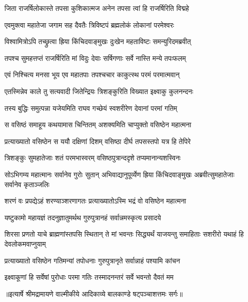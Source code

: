 \twolineshloka
{जिता राजर्षिलोकास्ते तपसा कुशिकात्मज}
{अनेन तपसा त्वां हि राजर्षिरिति विद्महे} %

\twolineshloka
{एवमुक्त्वा महातेजा जगाम सह दैवतैः}
{त्रिविष्टपं ब्रह्मलोकं लोकानां परमेश्वरः} %

\twolineshloka
{विश्वामित्रोऽपि तच्छ्रुत्वा ह्रिया किंचिदवाङ्मुखः}
{दुःखेन महताविष्टः समन्युरिदमब्रवीत्} %

\twolineshloka
{तपश्च सुमहत्तप्तं राजर्षिरिति मां विदुः}
{देवाः सर्षिगणाः सर्वे नास्ति मन्ये तपःफलम्} %

\twolineshloka
{एवं निश्चित्य मनसा भूय एव महातपाः}
{तपश्चचार काकुत्स्थ परमं परमात्मवान्} %

\twolineshloka
{एतस्मिन्नेव काले तु सत्यवादी जितेन्द्रियः}
{त्रिशङ्कुरिति विख्यात इक्ष्वाकु कुलनन्दनः} %

\twolineshloka
{तस्य बुद्धिः समुत्पन्ना यजेयमिति राघव}
{गच्छेयं स्वशरीरेण देवानां परमां गतिम्} %

\twolineshloka
{स वसिष्ठं समाहूय कथयामास चिन्तितम्}
{अशक्यमिति चाप्युक्तो वसिष्ठेन महात्मना} %

\twolineshloka
{प्रत्याख्यातो वसिष्ठेन स ययौ दक्षिणां दिशम्}
{वसिष्ठा दीर्घ तपसस्तपो यत्र हि तेपिरे} %

\twolineshloka
{त्रिशङ्कुः सुमहातेजाः शतं परमभास्वरम्}
{वसिष्ठपुत्रान्ददृशे तप्यमानान्यशस्विनः} %

\threelineshloka
{सोऽभिगम्य महात्मानः सर्वानेव गुरोः सुतान्}
{अभिवाद्यानुपूर्व्येण ह्रिया किंचिदवाङ्मुखः}
{अब्रवीत्सुमहातेजाः सर्वानेव कृताञ्जलिः} %

\twolineshloka
{शरणं वः प्रपद्येऽहं शरण्याञ्शरणागतः}
{प्रत्याख्यातोऽस्मि भद्रं वो वसिष्ठेन महात्मना} %

\twolineshloka
{यष्टुकामो महायज्ञं तदनुज्ञातुमर्थथ}
{गुरुपुत्रानहं सर्वान्नमस्कृत्य प्रसादये} %

\threelineshloka
{शिरसा प्रणतो याचे ब्राह्मणांस्तपसि स्थितान्}
{ते मां भवन्तः सिद्ध्यर्थं याजयन्तु समाहिताः}
{सशरीरो यथाहं हि देवलोकमवाप्नुयाम्} %

\twolineshloka
{प्रत्याख्यातो वसिष्ठेन गतिमन्यां तपोधनाः}
{गुरुपुत्रानृते सर्वान्नाहं पश्यामि कांचन} %

\twolineshloka
{इक्ष्वाकूणां हि सर्वेषां पुरोधाः परमा गतिः}
{तस्मादनन्तरं सर्वे भवन्तो दैवतं मम} %


{॥इत्यार्षे श्रीमद्रामायणे वाल्मीकीये आदिकाव्ये बालकाण्डे षट्पञ्चाशत्तमः सर्गः॥}

